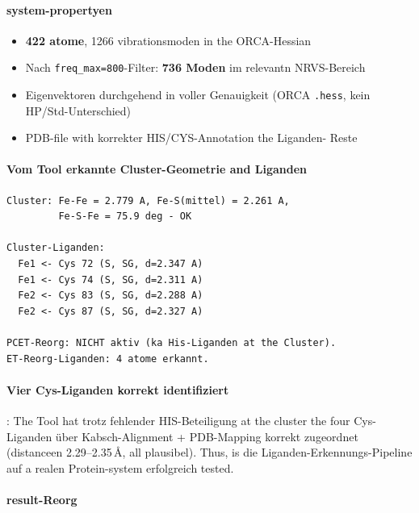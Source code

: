 \documentclass[11pt,a4paper,twoside]{article}
\providecommand{\angstrom}{\text{\AA}}    %
\theoremstyle{remark}
\begin{document}
\paragraph{system-propertyen}
\begin{itemize}\setlength{\itemsep}{0pt}
  \item \textbf{422 atome}, 1266 vibrationsmoden in the ORCA-Hessian
  \item Nach \texttt{freq\_max=800}-Filter: \textbf{736 Moden} im
        relevantn NRVS-Bereich
  \item Eigenvektoren durchgehend in voller Genauigkeit
        (ORCA \texttt{.hess}, kein HP/Std-Unterschied)
  \item PDB-file with korrekter HIS/CYS-Annotation the Liganden-
        Reste
\end{itemize}

\paragraph{Vom Tool erkannte Cluster-Geometrie and Liganden}

\begin{verbatim}
Cluster: Fe-Fe = 2.779 A, Fe-S(mittel) = 2.261 A,
         Fe-S-Fe = 75.9 deg - OK

Cluster-Liganden:
  Fe1 <- Cys 72 (S, SG, d=2.347 A)
  Fe1 <- Cys 74 (S, SG, d=2.311 A)
  Fe2 <- Cys 83 (S, SG, d=2.288 A)
  Fe2 <- Cys 87 (S, SG, d=2.327 A)

PCET-Reorg: NICHT aktiv (ka His-Liganden at the Cluster).
ET-Reorg-Liganden: 4 atome erkannt.
\end{verbatim}

\paragraph{Vier Cys-Liganden korrekt identifiziert}: The Tool hat
trotz fehlender HIS-Beteiligung at the cluster the four Cys-Liganden
\"uber Kabsch-Alignment + PDB-Mapping korrekt zugeordnet
(distanceen 2.29--2.35\,$\angstrom$, all plausibel). Thus, is die
Liganden-Erkennungs-Pipeline auf a realen Protein-system
erfolgreich tested.

\paragraph{result-Reorg}
\end{document}
